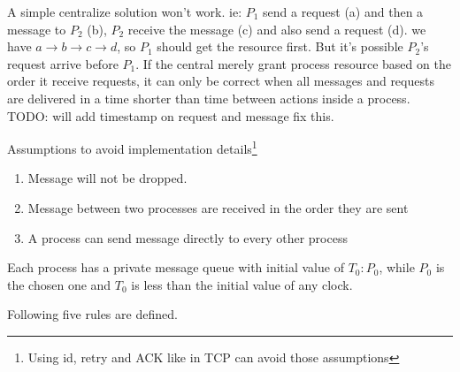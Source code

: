 \documentclass[12pt,a4paper,oneside]{article}
\begin{document}
A simple centralize solution won't work. ie: $P_1$ send a request (a) and then a message to $P_2$ (b), $P_2$ receive the message (c) and also send a request (d).
we have $a \rightarrow b \rightarrow c \rightarrow d$, so $P_1$ should get the resource first. But it's possible $P_2$'s request arrive before $P_1$.
If the central merely grant process resource based on the order it receive requests, it can only be correct when all messages and requests are delivered in a time
shorter than time between actions inside a process.
TODO: will add timestamp on request and message fix this.


Assumptions to avoid implementation details\footnote{Using id, retry and ACK like in TCP can avoid those assumptions}

\begin{enumerate}
  \item Message will not be dropped.
  \item Message between two processes are received in the order they are sent
  \item A process can send message directly to every other process
\end{enumerate}

Each process has a private message queue with initial value of $T_0:P_0$, while $P_0$ is the chosen one and
$T_0$ is less than the initial value of any clock.

Following five rules are defined.
\end{document}
